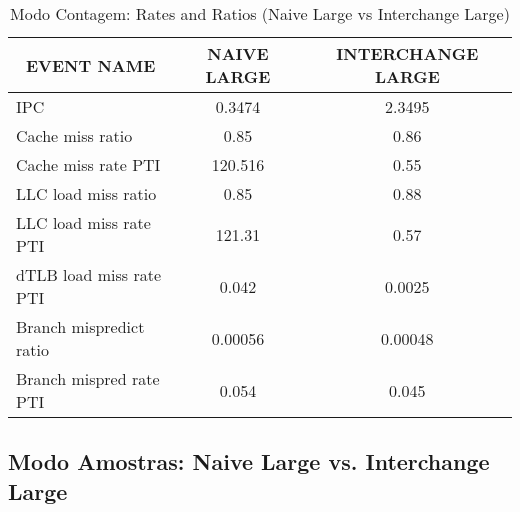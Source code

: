 \documentclass[11pt, oneside]{article}   	%
\begin{document}
\begin{table}[h!]
\centering
\label{table:modo_contagem_rates}
\begin{tabular}{|l|c|c|}
\hline
\multicolumn{1}{|c|}{\textbf{EVENT NAME}} & \textbf{NAIVE LARGE} & \textbf{INTERCHANGE LARGE} \\ \hline
IPC                                       & 0.3474               & 2.3495                     \\ \hline
Cache miss ratio                          & 0.85                 & 0.86                       \\ \hline
Cache miss rate PTI                       & 120.516              & 0.55                       \\ \hline
LLC load miss ratio                       & 0.85                 & 0.88                       \\ \hline
LLC load miss rate PTI                    & 121.31               & 0.57                       \\ \hline
dTLB load miss rate PTI                   & 0.042                & 0.0025                     \\ \hline
Branch mispredict ratio                   & 0.00056              & 0.00048                    \\ \hline
Branch mispred rate PTI                   & 0.054                & 0.045                      \\ \hline
\end{tabular}
\caption{Modo Contagem: Rates and Ratios (Naive Large vs Interchange Large)}
\end{table}

\subsection{Modo Amostras: Naive Large vs. Interchange Large}
\end{document}
